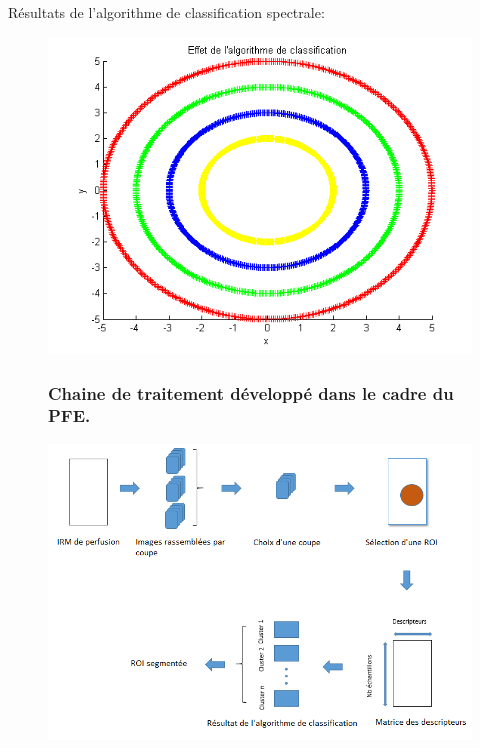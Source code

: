 \documentclass{beamer}
\begin{document}
\begin{frame}

Résultats de l'algorithme de classification spectrale:

\begin{figure}
\centering
\includegraphics[scale=0.5,angle=0]{AlgoClssification.png}
\label{fig:MA} 
\end{figure}

\end{frame}

\begin{frame}

\begin{figure}

\frametitle{Chaine de traitement développé dans le cadre du PFE.}
\centering
    \includegraphics[scale=0.5,angle=0]{Processing_toolchain.PNG}
    \label{fig:Chaine} 
    
\end{figure}

\end{frame}
\end{document}
